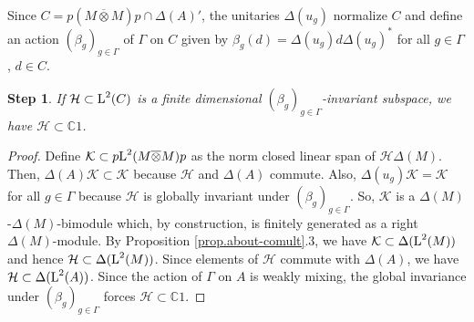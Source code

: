 \documentclass[a4paper,11pt]{amsart}
\numberwithin{equation}{section}
\newtheorem{step}{Step}[section]
\begin{document}
Since $C = p(M {\mathbin{\overline{\otimes}}} M)p \cap {\Delta}(A)'$, the unitaries ${\Delta}(u_g)$ normalize $C$ and define an action $({\beta}_g)_{g \in \Gamma}$ of $\Gamma$ on $C$ given by ${\beta}_g(d) = {\Delta}(u_g) d {\Delta}(u_g)^*$ for all $g \in \Gamma$, $d \in C$.

\begin{step}\label{step3}
If ${\mathcal{H}} \subset {\mathord{\text{\rm L}}}^2(C)$ is a finite dimensional $({\beta}_g)_{g \in \Gamma}$-invariant subspace, we have ${\mathcal{H}} \subset {\mathbb{C}} 1$.
\end{step}
\begin{proof}
Define ${\mathcal{K}} \subset p {\mathord{\text{\rm L}}}^2(M {\mathbin{\overline{\otimes}}} M) p$ as the norm closed linear span of ${\mathcal{H}} {\Delta}(M)$. Then, ${\Delta}(A) {\mathcal{K}} \subset {\mathcal{K}}$ because ${\mathcal{H}}$ and ${\Delta}(A)$ commute. Also, ${\Delta}(u_g) {\mathcal{K}} = {\mathcal{K}}$ for all $g \in \Gamma$ because ${\mathcal{H}}$ is globally invariant under $({\beta}_g)_{g \in \Gamma}$. So, ${\mathcal{K}}$ is a ${\Delta}(M)$-${\Delta}(M)$-bimodule which, by construction, is finitely generated as a right ${\Delta}(M)$-module. By Proposition \ref{prop.about-comult}.3, we have ${\mathcal{K}} \subset {\Delta}({\mathord{\text{\rm L}}}^2(M))$ and hence ${\mathcal{H}} \subset {\Delta}({\mathord{\text{\rm L}}}^2(M))$. Since elements of ${\mathcal{H}}$ commute with ${\Delta}(A)$, we have ${\mathcal{H}} \subset {\Delta}({\mathord{\text{\rm L}}}^2(A))$. Since the action of $\Gamma$ on $A$ is weakly mixing, the global invariance under $({\beta}_g)_{g \in \Gamma}$ forces ${\mathcal{H}} \subset {\mathbb{C}} 1$.
\end{proof}
\end{document}

